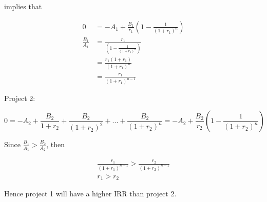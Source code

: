 \documentclass[11pt]{scrartcl}
\begin{document}
implies that

\begin{align*}
0 &= -A_1 + \frac{B_1}{r_1} \left(1-\frac{1}{(1+r_1)^n} \right)\\
\frac{B_1}{A_1} &= \frac{r_1}{\left(1-\frac{1}{(1+r_1)^n} \right)} \\
&= \frac{r_1 (1+r_1)}{(1+r_1)^n} \\
&= \frac{r_1}{(1+r_1)^{n-1}}
\end{align*}

Project 2:

\[0 = -A_2 + \frac{B_2}{1+r_2} + \frac{B_2}{(1+r_2)^2} + ... + \frac{B_2}{(1+r_2)^n} = -A_2 + \frac{B_2}{r_2} \left(1-\frac{1}{(1+r_2)^n}\right)\]

Since $\frac{B_1}{A_1} > \frac{B_2}{A_2}$, then

\begin{align*}
\frac{r_1}{(1+r_1)^{n-1}} > \frac{r_2}{(1+r_2)^{n-1}}\\
r_1 > r_2
\end{align*}

Hence project 1 will have a higher IRR than project 2.
\end{document}
